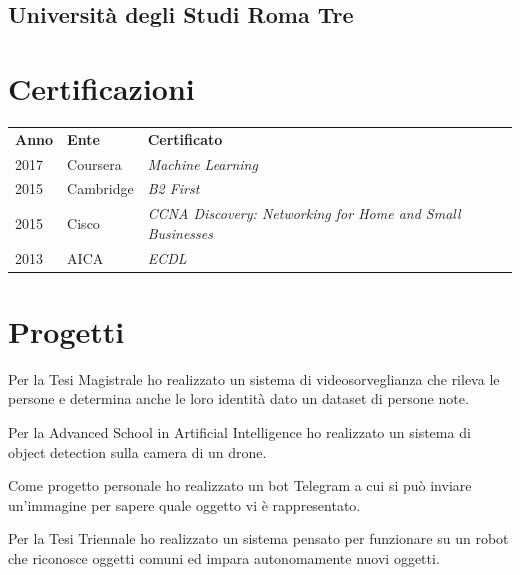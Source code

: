 \documentclass[]{deedy-resume-openfont}
\begin{document}
\begin{minipage}[t]{0.66\textwidth}
\subsection{Università degli Studi Roma Tre}
\sectionsep


\section{Certificazioni}
\begin{tabular}{@{}lll@{}}
\textbf{Anno} & \textbf{Ente} & \textbf{Certificato} \\
2017          & Coursera      & \textit{Machine Learning} \\
2015	      & Cambridge     & \textit{B2 First} \\
2015	      & Cisco         & \textit{CCNA Discovery: Networking for Home and Small Businesses} \\
2013	      & AICA          & \textit{ECDL} \\
\end{tabular}
\sectionsep


\section{Progetti}

Per la Tesi Magistrale ho realizzato un sistema di videosorveglianza che rileva le persone e determina anche le loro identità dato un dataset di persone note.

Per la Advanced School in Artificial Intelligence ho realizzato un sistema di object detection sulla camera di un drone.

Come progetto personale ho realizzato un bot Telegram a cui si può inviare un'immagine per sapere quale oggetto vi è rappresentato.

Per la Tesi Triennale ho realizzato un sistema pensato per funzionare su un robot che riconosce oggetti comuni ed impara autonomamente nuovi oggetti.



\end{minipage} 
\end{document}
